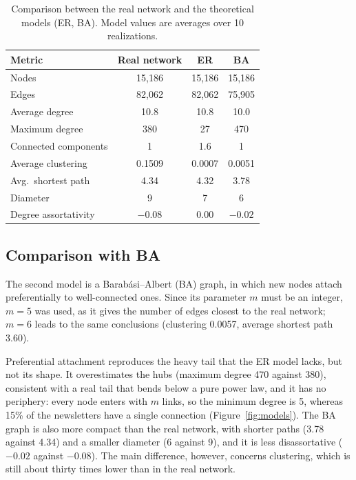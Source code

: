 \documentclass[sigchi]{acmart}
\begin{document}
\begin{table}[h]
  \centering
  \caption{Comparison between the real network and the theoretical
  models (ER, BA). Model values are averages over 10 realizations.}
  \label{tab:models}
  \begin{tabular}{lccc}
    \toprule
    \textbf{Metric} & \textbf{Real network} & \textbf{ER} & \textbf{BA} \\
    \midrule
    Nodes                  & 15{,}186 & 15{,}186 & 15{,}186 \\
    Edges                  & 82{,}062 & 82{,}062 & 75{,}905 \\
    Average degree         & 10.8     & 10.8     & 10.0 \\
    Maximum degree         & 380      & 27       & 470 \\
    Connected components   & 1        & 1.6      & 1 \\
    Average clustering     & 0.1509   & 0.0007   & 0.0051 \\
    Avg.\ shortest path    & 4.34     & 4.32     & 3.78 \\
    Diameter               & 9        & 7        & 6 \\
    Degree assortativity   & $-0.08$  & 0.00     & $-0.02$ \\
    \bottomrule
  \end{tabular}
\end{table}

\subsection{Comparison with BA}
\label{sec:ba}

The second model is a Barab\'asi--Albert (BA) graph, in which new nodes
attach preferentially to well-connected ones. Since its parameter $m$
must be an integer, $m=5$ was used, as it gives the number of edges
closest to the real network; $m=6$ leads to the same conclusions
(clustering 0.0057, average shortest path 3.60).

Preferential attachment reproduces the heavy tail that the ER model
lacks, but not its shape. It overestimates the hubs (maximum degree 470
against 380), consistent with a real tail that bends below a pure power
law, and it has no periphery: every node
enters with $m$ links, so the minimum degree is 5, whereas 15\% of the
newsletters have a single connection (Figure~\ref{fig:models}). The BA
graph is also more compact than the real network, with shorter paths
(3.78 against 4.34) and a smaller diameter (6 against 9), and it is
less disassortative ($-0.02$ against $-0.08$). The main difference,
however, concerns clustering, which is still about thirty times lower
than in the real network.
\end{document}
